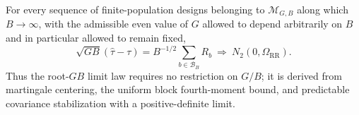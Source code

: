 For every sequence of finite-population designs belonging to \(\mathcal M_{G,B}\) along which \(B\to\infty\), with the admissible even value of \(G\) allowed to depend arbitrarily on \(B\) and in particular allowed to remain fixed,
\[
\sqrt{GB}(\widehat\tau-\tau)=B^{-1/2}\sum_{b\in\mathcal B_B}R_b\ \Rightarrow\ N_2(0,\Omega_{\mathrm{RR}}).
\]
Thus the root-\(GB\) limit law requires no restriction on \(G/B\); it is derived from martingale centering, the uniform block fourth-moment bound, and predictable covariance stabilization with a positive-definite limit.